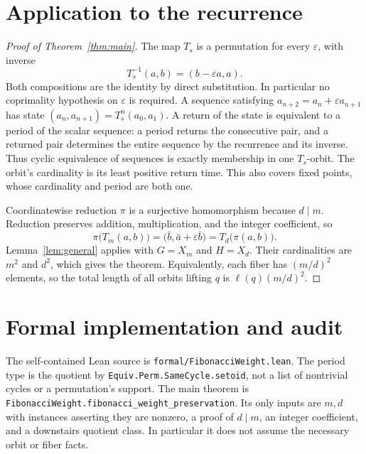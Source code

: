 \documentclass[11pt]{article}
\begin{document}
\section{Application to the recurrence}
\begin{proof}[Proof of Theorem~\ref{thm:main}]
The map $T_s$ is a permutation for every $\varepsilon$, with inverse
\[
 T_s^{-1}(a,b)=(b-\varepsilon a,a).
\]
Both compositions are the identity by direct substitution. In particular no
coprimality hypothesis on $\varepsilon$ is required. A sequence satisfying
$a_{n+2}=a_n+\varepsilon a_{n+1}$ has state $(a_n,a_{n+1})=T_s^n(a_0,a_1)$.
A return of the state is equivalent to a period of the scalar sequence: a
period returns the consecutive pair, and a returned pair determines the
entire sequence by the recurrence and its inverse. Thus cyclic equivalence
of sequences is exactly membership in one $T_s$-orbit. The orbit's cardinality
is its least positive return time. This also covers fixed points, whose
cardinality and period are both one.

Coordinatewise reduction $\pi$ is a surjective homomorphism because $d\mid m$.
Reduction preserves addition, multiplication, and the integer coefficient, so
\[
 \pi\bigl(T_m(a,b)\bigr)
   =\bigl(\bar b,\bar a+\varepsilon\bar b\bigr)
   =T_d\bigl(\pi(a,b)\bigr).
\]
Lemma~\ref{lem:general} applies with $G=X_m$ and $H=X_d$. Their cardinalities
are $m^2$ and $d^2$, which gives the theorem. Equivalently, each fiber has
$(m/d)^2$ elements, so the total length of all orbits lifting $q$ is
$\ell(q)(m/d)^2$.
\end{proof}

\section{Formal implementation and audit}
The self-contained Lean source is \texttt{formal/FibonacciWeight.lean}.
The period type is the quotient by
\texttt{Equiv.Perm.SameCycle.setoid}, not a list of nontrivial cycles or a
permutation's support. The main theorem is
\texttt{FibonacciWeight.fibonacci\_weight\_preservation}.
Its only inputs are $m,d$ with instances asserting they are nonzero, a proof
of $d\mid m$, an integer coefficient, and a downstairs quotient class.
In particular it does not assume the necessary orbit or fiber facts.
\end{document}
